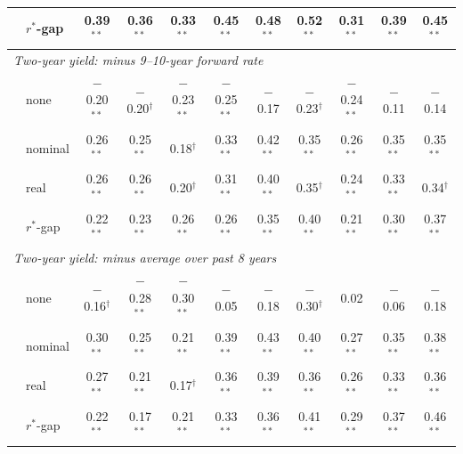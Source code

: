 \begin{tabular}{llccccccccc}
 & $r^*$-gap & 0.39$^{**}$ & 0.36$^{**}$ & 0.33$^{**}$ & 0.45$^{**}$ & 0.48$^{**}$ & 0.52$^{**}$ & 0.31$^{**}$ & 0.39$^{**}$ & 0.45$^{**}$ \\
\midrule
\multicolumn{11}{l}{\textit{Two-year yield: minus 9--10-year forward rate}}\\
 & none & $-$0.20$^{**}$ & $-$0.20$^{\dagger}$ & $-$0.23$^{**}$ & $-$0.25$^{**}$ & $-$0.17 & $-$0.23$^{\dagger}$ & $-$0.24$^{**}$ & $-$0.11 & $-$0.14 \\
 & nominal & 0.26$^{**}$ & 0.25$^{**}$ & 0.18$^{\dagger}$ & 0.33$^{**}$ & 0.42$^{**}$ & 0.35$^{**}$ & 0.26$^{**}$ & 0.35$^{**}$ & 0.35$^{**}$ \\
 & real & 0.26$^{**}$ & 0.26$^{**}$ & 0.20$^{\dagger}$ & 0.31$^{**}$ & 0.40$^{**}$ & 0.35$^{\dagger}$ & 0.24$^{**}$ & 0.33$^{**}$ & 0.34$^{\dagger}$ \\
 & $r^*$-gap & 0.22$^{**}$ & 0.23$^{**}$ & 0.26$^{**}$ & 0.26$^{**}$ & 0.35$^{**}$ & 0.40$^{**}$ & 0.21$^{**}$ & 0.30$^{**}$ & 0.37$^{**}$ \\
\midrule
\multicolumn{11}{l}{\textit{Two-year yield: minus average over past 8 years}}\\
 & none & $-$0.16$^{\dagger}$ & $-$0.28$^{**}$ & $-$0.30$^{**}$ & $-$0.05 & $-$0.18 & $-$0.30$^{\dagger}$ & 0.02 & $-$0.06 & $-$0.18 \\
 & nominal & 0.30$^{**}$ & 0.25$^{**}$ & 0.21$^{**}$ & 0.39$^{**}$ & 0.43$^{**}$ & 0.40$^{**}$ & 0.27$^{**}$ & 0.35$^{**}$ & 0.38$^{**}$ \\
 & real & 0.27$^{**}$ & 0.21$^{**}$ & 0.17$^{\dagger}$ & 0.36$^{**}$ & 0.39$^{**}$ & 0.36$^{**}$ & 0.26$^{**}$ & 0.33$^{**}$ & 0.36$^{**}$ \\
 & $r^*$-gap & 0.22$^{**}$ & 0.17$^{**}$ & 0.21$^{**}$ & 0.33$^{**}$ & 0.36$^{**}$ & 0.41$^{**}$ & 0.29$^{**}$ & 0.37$^{**}$ & 0.46$^{**}$ \\
\bottomrule
\end{tabular}
